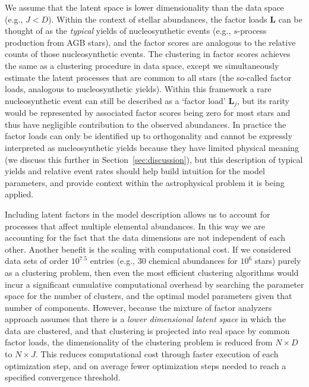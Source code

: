 \documentclass[twocolumn]{aastex62}
\newcommand{\factorloads}{\textbf{L}}
\newcommand{\NumDimensions}{D}
\newcommand{\NumLatentFactors}{J}
\newcommand{\numlatentfactors}{j}
\begin{document}
We assume that the latent space is lower dimensionality than the
data space (e.g., $\NumLatentFactors < \NumDimensions$).
Within the context of stellar abundances, the factor loads
$\factorloads$ can be thought of as the \emph{typical} yields
of nucleosynthetic
events (e.g., $s$-process production from AGB stars), and the
factor scores are analogous to the relative counts of those 
nucleosynthetic events. The clustering in factor scores
achieves the same as a clustering procedure in data space,
except we simultaneously estimate the latent processes that are
common to all stars (the so-called factor loads, analogous to 
nucleosynthetic yields). Within this framework a rare nucleosynthetic event
can still be described as a `factor load' $\factorloads_\numlatentfactors$, 
but its rarity would be represented by associated factor
scores being zero for most stars and thus have negligible contribution
to the observed abundances. In practice the factor loads can only be 
identified up to orthogonality and cannot be expressly interpreted as
nucleosynthetic yields because they have limited physical meaning
(we discuss this further in Section~\ref{sec:discussion}),
but this description of typical yields and relative event rates should
help build intuition for the model parameters, and provide context
within the astrophysical problem it is being applied.


Including latent factors in the model description allows us to account for 
processes that affect multiple elemental abundances. In this way we are 
accounting for the fact that the data dimensions are not independent of
each other. Another benefit is the scaling with computational cost. If we 
considered data sets of order $10^{7.5}$
entries (e.g., 30 chemical abundances for $10^6$ stars) purely as a
clustering problem, then even the most efficient clustering
algorithms would incur a significant cumulative computational 
overhead by searching the parameter space for the number of
clusters, and the optimal model parameters given that number
of components. However, because the mixture of factor analyzers
approach assumes that there is a \emph{lower dimensional latent 
space} in which the data are clustered, and that clustering is 
projected into real space by common factor loads, the 
dimensionality of the clustering problem is reduced from 
$N \times D$ to $N \times J$. This reduces computational cost through
faster execution of each optimization step, and on average fewer optimization steps
needed to reach a specified convergence threshold.
\end{document}

